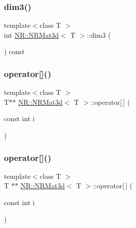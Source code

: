 \mbox{\label{classNR_1_1NRMat3d_aec8af45aa2025ea53f2967a79d0fe233}} 
\subsubsection{\texorpdfstring{dim3()}{dim3()}\hspace{0.1cm}{\footnotesize\ttfamily [2/2]}}
{\footnotesize\ttfamily template$<$class T $>$ \\
int \mbox{\hyperlink{classNR_1_1NRMat3d}{N\+R\+::\+N\+R\+Mat3d}}$<$ T $>$\+::dim3 (\begin{DoxyParamCaption}{ }\end{DoxyParamCaption}) const\hspace{0.3cm}{\ttfamily [inline]}}

\mbox{\label{classNR_1_1NRMat3d_a24920cbac3d063139022a4aafee24e4a}} 
\subsubsection{\texorpdfstring{operator[]()}{operator[]()}\hspace{0.1cm}{\footnotesize\ttfamily [1/4]}}
{\footnotesize\ttfamily template$<$class T $>$ \\
T$\ast$$\ast$ \mbox{\hyperlink{classNR_1_1NRMat3d}{N\+R\+::\+N\+R\+Mat3d}}$<$ T $>$\+::operator\mbox{[}$\,$\mbox{]} (\begin{DoxyParamCaption}\item[{const int}]{i }\end{DoxyParamCaption})\hspace{0.3cm}{\ttfamily [inline]}}

\mbox{\label{classNR_1_1NRMat3d_a2a302c22836b7c9872fb837f7c6a64c1}} 
\subsubsection{\texorpdfstring{operator[]()}{operator[]()}\hspace{0.1cm}{\footnotesize\ttfamily [2/4]}}
{\footnotesize\ttfamily template$<$class T $>$ \\
T $\ast$$\ast$ \mbox{\hyperlink{classNR_1_1NRMat3d}{N\+R\+::\+N\+R\+Mat3d}}$<$ T $>$\+::operator\mbox{[}$\,$\mbox{]} (\begin{DoxyParamCaption}\item[{const int}]{i }\end{DoxyParamCaption})\hspace{0.3cm}{\ttfamily [inline]}}


